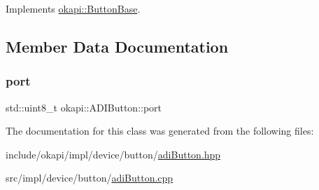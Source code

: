 Implements \mbox{\hyperlink{classokapi_1_1ButtonBase_a748b6f2b5ebce9fa9f6bbc9d170d3d7a}{okapi\+::\+Button\+Base}}.



\subsection{Member Data Documentation}
\mbox{\label{classokapi_1_1ADIButton_a0bded65076f7c921a55377a5abe0b407}} 
\subsubsection{\texorpdfstring{port}{port}}
{\footnotesize\ttfamily std\+::uint8\+\_\+t okapi\+::\+A\+D\+I\+Button\+::port\hspace{0.3cm}{\ttfamily [protected]}}



The documentation for this class was generated from the following files\+:\begin{DoxyCompactItemize}
\item 
include/okapi/impl/device/button/\mbox{\hyperlink{adiButton_8hpp}{adi\+Button.\+hpp}}\item 
src/impl/device/button/\mbox{\hyperlink{adiButton_8cpp}{adi\+Button.\+cpp}}\end{DoxyCompactItemize}
